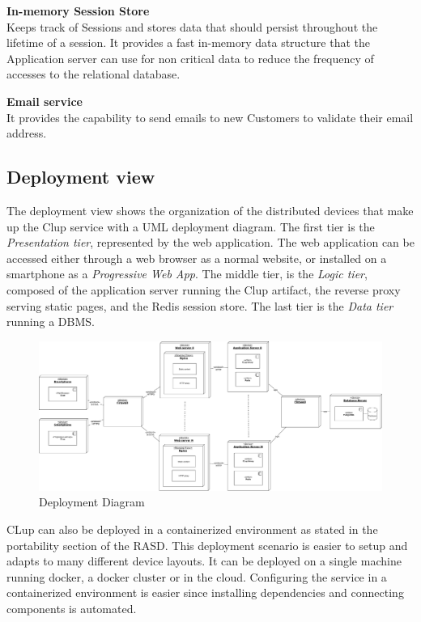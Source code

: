 \textbf{In-memory Session Store}\\ Keeps track of Sessions and stores data that should persist throughout the lifetime of a session. It provides a fast in-memory data structure that the Application server can use for non critical data to reduce the frequency of accesses to the relational database.

\textbf{Email service}\\ It provides the capability to send emails to new Customers to validate their email address.


\subsection{Deployment view}
The deployment view shows the organization of the distributed devices that make up the Clup service with a UML deployment diagram. The first tier is the \emph{Presentation tier}, represented by the web application. The web application can be accessed either through a web browser as a normal website, or installed on a smartphone as a \emph{Progressive Web App}. The middle tier, is the \emph{Logic tier}, composed of the application server running the Clup artifact, the reverse proxy serving static pages, and the Redis session store. The last tier is the \emph{Data tier} running a DBMS.
\begin{figure}[H]
    \centering
    \includegraphics[width=1\textwidth]{Images/deployment-1.pdf}
    \caption{Deployment Diagram}
\end{figure}
CLup can also be deployed in a containerized environment as stated in the portability section of the RASD. This deployment scenario is easier to setup and adapts to many different device layouts. It can be deployed on a single machine running docker, a docker cluster or in the cloud. Configuring the service in a containerized environment is easier since installing dependencies and connecting components is automated.
